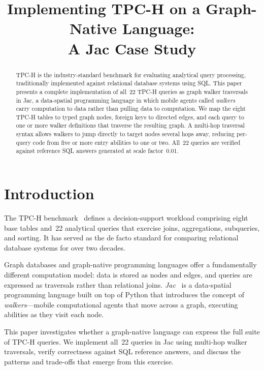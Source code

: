 \documentclass[11pt]{article}
\title{Implementing TPC-H on a Graph-Native Language:\\A Jac Case Study}
\author{}
\date{}
\begin{document}
\maketitle

\begin{abstract}
TPC-H is the industry-standard benchmark for evaluating analytical query processing,
traditionally implemented against relational database systems using SQL.
This paper presents a complete implementation of all~22 TPC-H queries
as graph walker traversals in Jac, a data-spatial programming language
in which mobile agents called \emph{walkers} carry computation to data
rather than pulling data to computation.
We map the eight TPC-H tables to typed graph nodes, foreign keys to directed
edges, and each query to one or more walker definitions that traverse the
resulting graph.
A multi-hop traversal syntax allows walkers to jump directly to target nodes
several hops away, reducing per-query code from five or more entry abilities
to one or two.
All~22 queries are verified against reference SQL answers generated at scale
factor~0.01.
\end{abstract}

\section{Introduction}

The TPC-H benchmark~\cite{tpch} defines a decision-support workload comprising
eight base tables and~22 analytical queries that exercise joins, aggregations,
subqueries, and sorting.
It has served as the de facto standard for comparing relational
database systems for over two decades.

Graph databases and graph-native programming languages offer a fundamentally
different computation model: data is stored as nodes and edges, and queries
are expressed as traversals rather than relational joins.
\emph{Jac}~\cite{jac} is a data-spatial programming language built on top of
Python that introduces the concept of \emph{walkers}---mobile computational
agents that move across a graph, executing abilities as they visit each node.

This paper investigates whether a graph-native language can express the full
suite of TPC-H queries.
We implement all~22 queries in Jac using multi-hop walker traversals,
verify correctness against SQL reference answers, and discuss the
patterns and trade-offs that emerge from this exercise.
\end{document}
